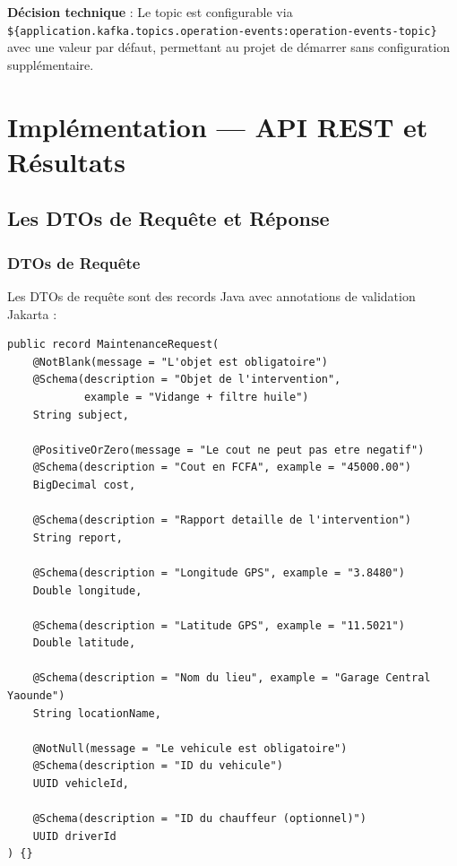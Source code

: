 \documentclass[12pt,a4paper]{report}
\begin{document}
\textbf{Décision technique} : Le topic est configurable via \texttt{\$\{application.kafka.topics.operation-events:operation-events-topic\}} avec une valeur par défaut, permettant au projet de démarrer sans configuration supplémentaire.

\chapter{Implémentation — API REST et Résultats}

\section{Les DTOs de Requête et Réponse}

\subsection{DTOs de Requête}

Les DTOs de requête sont des records Java avec annotations de validation Jakarta :

\begin{lstlisting}[style=javaStyle, caption={DTO de requête MaintenanceRequest}]
public record MaintenanceRequest(
    @NotBlank(message = "L'objet est obligatoire")
    @Schema(description = "Objet de l'intervention",
            example = "Vidange + filtre huile")
    String subject,

    @PositiveOrZero(message = "Le cout ne peut pas etre negatif")
    @Schema(description = "Cout en FCFA", example = "45000.00")
    BigDecimal cost,

    @Schema(description = "Rapport detaille de l'intervention")
    String report,

    @Schema(description = "Longitude GPS", example = "3.8480")
    Double longitude,

    @Schema(description = "Latitude GPS", example = "11.5021")
    Double latitude,

    @Schema(description = "Nom du lieu", example = "Garage Central Yaounde")
    String locationName,

    @NotNull(message = "Le vehicule est obligatoire")
    @Schema(description = "ID du vehicule")
    UUID vehicleId,

    @Schema(description = "ID du chauffeur (optionnel)")
    UUID driverId
) {}
\end{lstlisting}
\end{document}
